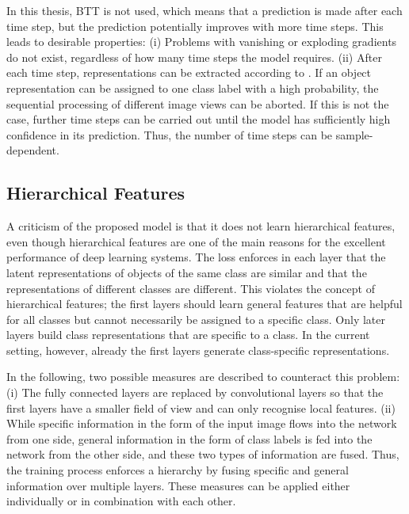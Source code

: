 In this thesis, BTT is not used, which means that a prediction is made after each time step, but the prediction potentially improves with more time steps. This leads to desirable properties: (i) Problems with vanishing or exploding gradients do not exist, regardless of how many time steps the model requires. (ii) After each time step, representations can be extracted according to . If an object representation can be assigned to one class label with a high probability, the sequential processing of different image views can be aborted. If this is not the case, further time steps can be carried out until the model has sufficiently high confidence in its prediction. Thus, the number of time steps can be sample-dependent.



\subsection{Hierarchical Features}
A criticism of the proposed model is that it does not learn hierarchical features, even though hierarchical features are one of the main reasons for the excellent performance of deep learning systems. The loss enforces in each layer that the latent representations of objects of the same class are similar and that the representations of different classes are different. This violates the concept of hierarchical features; the first layers should learn general features that are helpful for all classes but cannot necessarily be assigned to a specific class. Only later layers build class representations that are specific to a class. In the current setting, however, already the first layers generate class-specific representations.

In the following, two possible measures are described to counteract this problem: (i) The fully connected layers are replaced by convolutional layers so that the first layers have a smaller field of view and can only recognise local features. (ii) While specific information in the form of the input image flows into the network from one side, general information in the form of class labels is fed into the network from the other side, and these two types of information are fused. Thus, the training process enforces a hierarchy by fusing specific and general information over multiple layers.
These measures can be applied either individually or in combination with each other.


